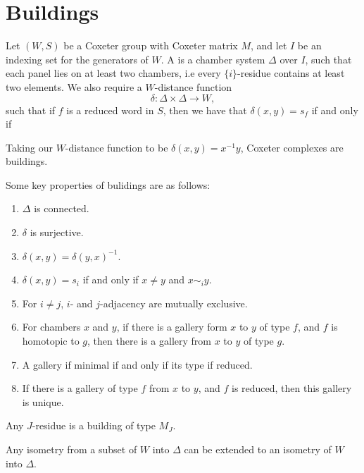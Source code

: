 \documentclass[11pt]{article}
\begin{document}
\section{Buildings}

\begin{definition}
    Let $(W,S)$ be a Coxeter group with Coxeter matrix $M$, and let $I$ be an indexing set for the generators of $W$. A  is a chamber system $\Delta$ over $I$, such that each panel lies on at least two chambers, i.e every $\{i\}$-residue contains at least two elements. We also require a $W$-distance function
    \[\delta:\Delta\times \Delta \to W,\]
    such that if $f$ is a reduced word in $S$, then we have that $\delta(x,y)=s_f$ if and only if 
\end{definition}



\begin{example}
    Taking our $W$-distance function to be $\delta(x,y)=x^{-1}y$, Coxeter complexes are buildings.
\end{example}


Some key properties of bulidings are as follows:
\begin{enumerate}
    \item $\Delta$ is connected.
    \item $\delta$ is surjective.
    \item $\delta(x,y)=\delta(y,x)^{-1}$.
    \item $\delta(x,y)=s_i$ if and only if $x\neq y$ and $x\sim_i y$.
    \item For $i\neq j$, $i$- and $j$-adjacency are mutually exclusive.
    \item For chambers $x$ and $y$, if there is a gallery form $x$ to $y$ of type $f$, and $f$ is homotopic to $g$, then there is a gallery from $x$ to $y$ of type $g$. 
    \item A gallery if minimal if and only if its type if reduced.
    \item If there is a gallery of type $f$ from $x$ to $y$, and $f$ is reduced, then this gallery is unique.
\end{enumerate}

\begin{theorem}
    Any $J$-residue is a building of type $M_J$. 
\end{theorem}

\begin{theorem}
    Any isometry from a subset of $W$ into $\Delta$ can be extended to an isometry of $W$ into $\Delta$.
\end{theorem}
\end{document}
